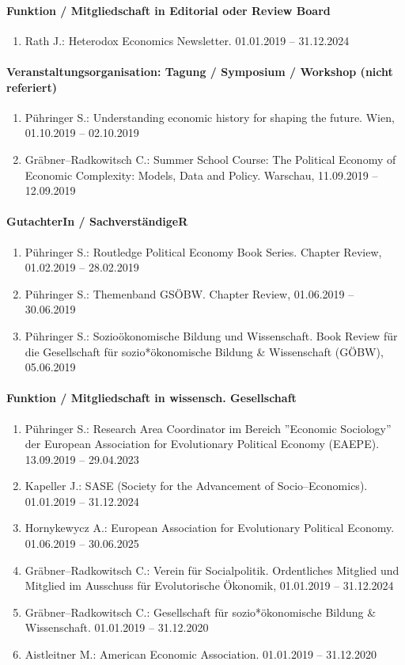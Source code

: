 \paragraph{Funktion / Mitgliedschaft in Editorial oder Review Board}
\begin{enumerate}[leftmargin=*, labelsep=0.5cm]
\item Rath J.: Heterodox Economics Newsletter. 01.01.2019 -- 31.12.2024
\end{enumerate}
\paragraph{Veranstaltungsorganisation: Tagung / Symposium / Workshop (nicht referiert)}
\begin{enumerate}[leftmargin=*, labelsep=0.5cm]
\item Pühringer S.: Understanding economic history for shaping the future. Wien, 01.10.2019 -- 02.10.2019
\item Gräbner--Radkowitsch C.: Summer School Course: The Political Economy of Economic Complexity: Models, Data and Policy. Warschau, 11.09.2019 -- 12.09.2019
\end{enumerate}
\paragraph{GutachterIn / SachverständigeR}
\begin{enumerate}[leftmargin=*, labelsep=0.5cm]
\item Pühringer S.: Routledge Political Economy Book Series. Chapter Review, 01.02.2019 -- 28.02.2019
\item Pühringer S.: Themenband GSÖBW. Chapter Review, 01.06.2019 -- 30.06.2019
\item Pühringer S.: Sozioökonomische Bildung und Wissenschaft. Book Review für die Gesellschaft für sozio*ökonomische Bildung \& Wissenschaft (GÖBW), 05.06.2019
\end{enumerate}
\paragraph{Funktion / Mitgliedschaft in wissensch. Gesellschaft}
\begin{enumerate}[leftmargin=*, labelsep=0.5cm]
\item Pühringer S.: Research Area Coordinator im Bereich ''Economic Sociology'' der European Association for Evolutionary Political Economy (EAEPE). 13.09.2019 -- 29.04.2023
\item Kapeller J.: SASE (Society for the Advancement of Socio--Economics). 01.01.2019 -- 31.12.2024
\item Hornykewycz A.: European Association for Evolutionary Political Economy. 01.06.2019 -- 30.06.2025
\item Gräbner--Radkowitsch C.: Verein für Socialpolitik. Ordentliches Mitglied und Mitglied im Ausschuss für Evolutorische Ökonomik, 01.01.2019 -- 31.12.2024
\item Gräbner--Radkowitsch C.: Gesellschaft für sozio*ökonomische Bildung \& Wissenschaft. 01.01.2019 -- 31.12.2020
\item Aistleitner M.: American Economic Association. 01.01.2019 -- 31.12.2020
\end{enumerate}
